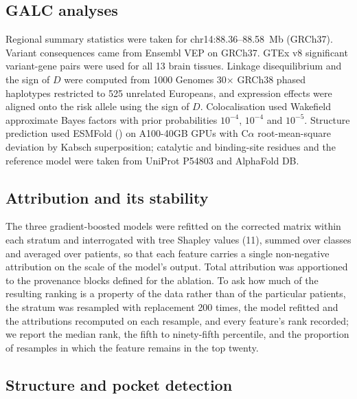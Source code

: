 \documentclass[10pt]{article}
\begin{document}
\subsection*{GALC analyses}

Regional summary statistics were taken for chr14:88.36--88.58~Mb (GRCh37). Variant consequences
came from Ensembl VEP on GRCh37. GTEx v8 significant variant-gene pairs were used for all 13 brain
tissues. Linkage disequilibrium and the sign of $D$ were computed from 1000 Genomes 30$\times$
GRCh38 phased haplotypes restricted to 525 unrelated Europeans, and expression effects were
aligned onto the risk allele using the sign of $D$. Colocalisation used Wakefield approximate
Bayes factors with prior probabilities $10^{-4}$, $10^{-4}$ and $10^{-5}$. Structure prediction
used ESMFold () on A100-40GB GPUs with C$\alpha$ root-mean-square
deviation by Kabsch superposition; catalytic and binding-site residues and the reference model
were taken from UniProt P54803 and AlphaFold DB.

\subsection*{Attribution and its stability}

The three gradient-boosted models were refitted on the corrected matrix within each stratum and
interrogated with tree Shapley values (11), summed over classes and averaged over patients, so that
each feature carries a single non-negative attribution on the scale of the model's output. Total
attribution was apportioned to the provenance blocks defined for the ablation. To ask how much of
the resulting ranking is a property of the data rather than of the particular patients, the
stratum was resampled with replacement 200 times, the model refitted and the attributions
recomputed on each resample, and every feature's rank recorded; we report the median rank, the
fifth to ninety-fifth percentile, and the proportion of resamples in which the feature remains in
the top twenty.

\subsection*{Structure and pocket detection}
\end{document}
